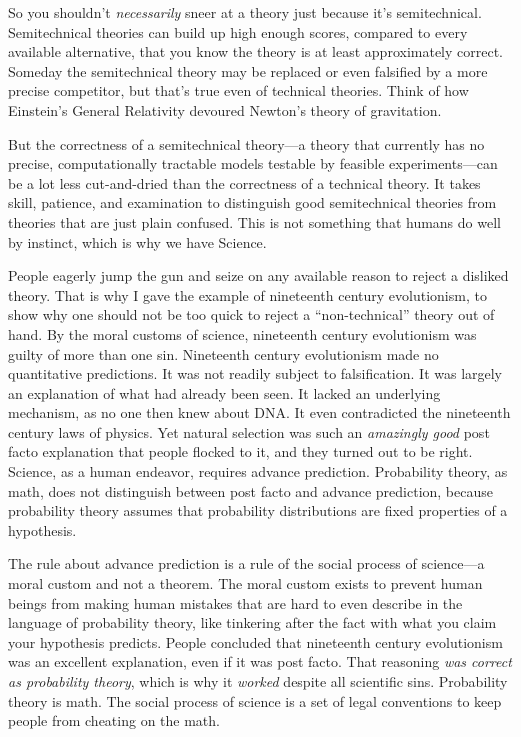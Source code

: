 {
 So you shouldn't \textit{necessarily} sneer at a
theory just because it's semitechnical. Semitechnical
theories can build up high enough scores, compared to every available
alternative, that you know the theory is at least approximately
correct. Someday the semitechnical theory may be replaced or even
falsified by a more precise competitor, but that's true
even of technical theories. Think of how Einstein's
General Relativity devoured Newton's theory of
gravitation.}

{
 But the correctness of a semitechnical theory---a theory that
currently has no precise, computationally tractable models testable by
feasible experiments---can be a lot less cut-and-dried than the
correctness of a technical theory. It takes skill, patience, and
examination to distinguish good semitechnical theories from theories
that are just plain confused. This is not something that humans do well
by instinct, which is why we have Science.}

{
 People eagerly jump the gun and seize on any available reason to
reject a disliked theory. That is why I gave the example of nineteenth
century evolutionism, to show why one should not be too quick to reject
a ``non-technical'' theory out of
hand. By the moral customs of science, nineteenth century evolutionism
was guilty of more than one sin. Nineteenth century evolutionism made
no quantitative predictions. It was not readily subject to
falsification. It was largely an explanation of what had already been
seen. It lacked an underlying mechanism, as no one then knew about DNA.
It even contradicted the nineteenth century laws of physics. Yet
natural selection was such an \textit{amazingly good} post facto
explanation that people flocked to it, and they turned out to be right.
Science, as a human endeavor, requires advance prediction. Probability
theory, as math, does not distinguish between post facto and advance
prediction, because probability theory assumes that probability
distributions are fixed properties of a hypothesis.}

{
 The rule about advance prediction is a rule of the social process
of science---a moral custom and not a theorem. The moral custom exists
to prevent human beings from making human mistakes that are hard to
even describe in the language of probability theory, like tinkering
after the fact with what you claim your hypothesis predicts. People
concluded that nineteenth century evolutionism was an excellent
explanation, even if it was post facto. That reasoning \textit{was
correct as probability theory}, which is why it \textit{worked} despite
all scientific sins. Probability theory is math. The social process of
science is a set of legal conventions to keep people from cheating on
the math.}

